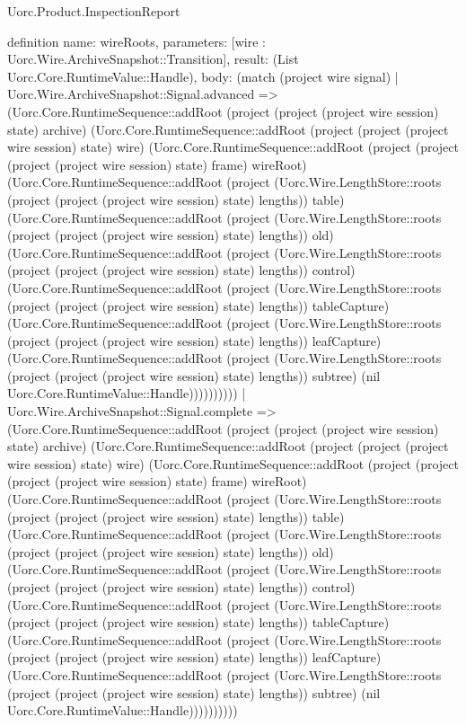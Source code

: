 \begin{lexlean}{Uorc.Product.InspectionReport}
\begin{semanticmodule}
definition{
  name: wireRoots,
  parameters: [wire : Uorc.Wire.ArchiveSnapshot::Transition],
  result: (List Uorc.Core.RuntimeValue::Handle),
  body: (match (project wire signal)
    | Uorc.Wire.ArchiveSnapshot::Signal.advanced => (Uorc.Core.RuntimeSequence::addRoot (project (project (project wire session) state) archive) (Uorc.Core.RuntimeSequence::addRoot (project (project (project wire session) state) wire) (Uorc.Core.RuntimeSequence::addRoot (project (project (project (project wire session) state) frame) wireRoot) (Uorc.Core.RuntimeSequence::addRoot (project (Uorc.Wire.LengthStore::roots (project (project (project wire session) state) lengths)) table) (Uorc.Core.RuntimeSequence::addRoot (project (Uorc.Wire.LengthStore::roots (project (project (project wire session) state) lengths)) old) (Uorc.Core.RuntimeSequence::addRoot (project (Uorc.Wire.LengthStore::roots (project (project (project wire session) state) lengths)) control) (Uorc.Core.RuntimeSequence::addRoot (project (Uorc.Wire.LengthStore::roots (project (project (project wire session) state) lengths)) tableCapture) (Uorc.Core.RuntimeSequence::addRoot (project (Uorc.Wire.LengthStore::roots (project (project (project wire session) state) lengths)) leafCapture) (Uorc.Core.RuntimeSequence::addRoot (project (Uorc.Wire.LengthStore::roots (project (project (project wire session) state) lengths)) subtree) (nil Uorc.Core.RuntimeValue::Handle))))))))))
    | Uorc.Wire.ArchiveSnapshot::Signal.complete => (Uorc.Core.RuntimeSequence::addRoot (project (project (project wire session) state) archive) (Uorc.Core.RuntimeSequence::addRoot (project (project (project wire session) state) wire) (Uorc.Core.RuntimeSequence::addRoot (project (project (project (project wire session) state) frame) wireRoot) (Uorc.Core.RuntimeSequence::addRoot (project (Uorc.Wire.LengthStore::roots (project (project (project wire session) state) lengths)) table) (Uorc.Core.RuntimeSequence::addRoot (project (Uorc.Wire.LengthStore::roots (project (project (project wire session) state) lengths)) old) (Uorc.Core.RuntimeSequence::addRoot (project (Uorc.Wire.LengthStore::roots (project (project (project wire session) state) lengths)) control) (Uorc.Core.RuntimeSequence::addRoot (project (Uorc.Wire.LengthStore::roots (project (project (project wire session) state) lengths)) tableCapture) (Uorc.Core.RuntimeSequence::addRoot (project (Uorc.Wire.LengthStore::roots (project (project (project wire session) state) lengths)) leafCapture) (Uorc.Core.RuntimeSequence::addRoot (project (Uorc.Wire.LengthStore::roots (project (project (project wire session) state) lengths)) subtree) (nil Uorc.Core.RuntimeValue::Handle))))))))))
}
\end{semanticmodule}
\end{lexlean}
